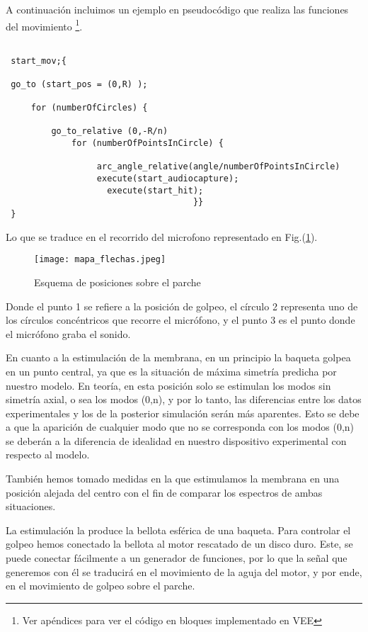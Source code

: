 \documentclass[journal, a4paper,onecolumn]{IEEEtran}
\newcommand{\figref}[1]{Fig.(\ref{#1})}
\begin{document}
A continuación incluimos un ejemplo en pseudocódigo que realiza las funciones del movimiento \footnote{Ver apéndices para ver el código en bloques implementado en VEE}.
\newpage

 \begin{lstlisting}
 
 start_mov;{
 
 go_to (start_pos = (0,R) );
 
     for (numberOfCircles) {
     
         go_to_relative (0,-R/n)
             for (numberOfPointsInCircle) {
    
                  arc_angle_relative(angle/numberOfPointsInCircle)
                  execute(start_audiocapture);
                    execute(start_hit);
                                     }}
 }
 \end{lstlisting}

Lo que se traduce en el recorrido del microfono representado en \figref{mapa flechas}.

\begin{figure}[H]
    \centering
    \texttt{[image: mapa\_flechas.jpeg]}
    \caption{Esquema de posiciones sobre el parche}
    \label{mapa flechas}
\end{figure}

Donde el punto 1 se refiere a la posición de golpeo, el círculo 2 representa uno de los círculos concéntricos que recorre el micrófono, y el punto 3 es el punto donde el micrófono graba el sonido.\newline 

En cuanto a la estimulación de la membrana, en un principio la baqueta golpea en un punto central, ya que es la situación de máxima simetría predicha por nuestro modelo. En teoría, en esta posición solo se estimulan los modos sin simetría axial, o sea los modos (0,n), y por lo tanto, las diferencias entre los datos experimentales y los de la posterior simulación serán más aparentes. Esto se debe a que la aparición de cualquier modo que no se corresponda con los modos (0,n) se deberán a la diferencia de idealidad en nuestro dispositivo experimental con respecto al modelo.\newline

También hemos tomado medidas en la que estimulamos la membrana en una posición alejada del centro con el fin de comparar los espectros de ambas situaciones.\newline

La estimulación la produce la bellota esférica de una baqueta. Para controlar el golpeo hemos conectado la bellota al motor rescatado de un disco duro. Este, se puede conectar fácilmente a un generador de funciones, por lo que la señal que generemos con él se traducirá en el movimiento de la aguja del motor, y por ende, en el movimiento de golpeo sobre el parche.
\newline
\end{document}
